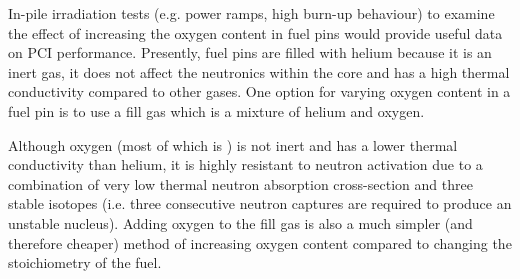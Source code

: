 In-pile irradiation tests (e.g. power ramps, high burn-up behaviour) to examine the effect of increasing the oxygen content in fuel pins would provide useful data on PCI performance. Presently, fuel pins are filled with helium because it is an inert gas, it does not affect the neutronics within the core and has a high thermal conductivity compared to other gases. One option for varying oxygen content in a fuel pin is to use a fill gas which is a mixture of helium and oxygen. 

Although oxygen (most of which is ) is not inert and has a lower thermal conductivity than helium, it is highly resistant to neutron activation due to a combination of very low thermal neutron absorption cross-section and three stable isotopes (i.e. three consecutive neutron captures are required to produce an unstable  nucleus). Adding oxygen to the fill gas is also a much simpler (and therefore cheaper) method of increasing oxygen content compared to changing the stoichiometry of the fuel.

